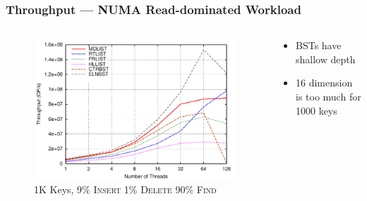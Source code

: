 \documentclass{beamer}
\begin{document}
\begin{frame} \frametitle{Throughput --- NUMA Read-dominated Workload}
    \begin{columns}
        \begin{column}{8cm}
            \begin{figure}[t]
                \centering
                \includegraphics[width=1\columnwidth]{amd9ins1Kkey.pdf}
                \caption{1K Keys, 9\% \textsc{Insert} 1\% \textsc{Delete} 90\% \textsc{Find}}
                \end{figure}
            \end{column}
            \begin{column}{4.3cm}
                \begin{itemize}
                    \item BSTs have shallow depth
                    \item 16 dimension is too much for 1000 keys
                \end{itemize}
            \end{column}
        \end{columns}
\end{frame}
\end{document}
